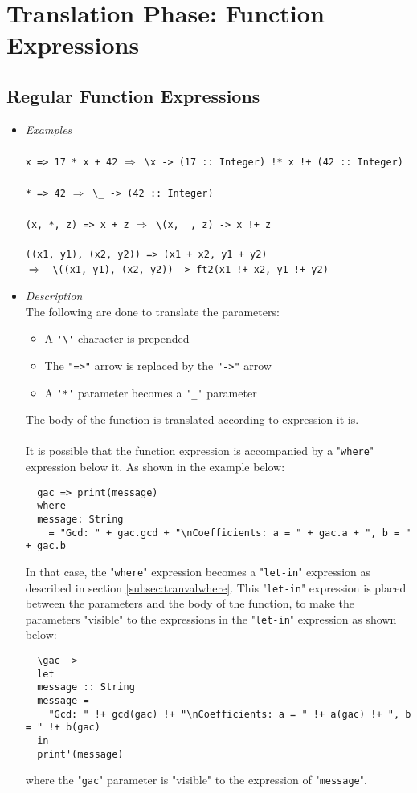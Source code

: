 \documentclass[diploma]{softlab-thesis}
\def\lra{$\Longrightarrow$\ }
\begin{document}
\newpage
\section{Translation Phase: Function Expressions}

\subsection{Regular Function Expressions}

\begin{itemize}
\item
\textit{Examples}\\\\
\verb|x => 17 * x + 42| \lra \verb|\x -> (17 :: Integer) !* x !+ (42 :: Integer)|
\\\\
\verb|* => 42| \lra \verb|\_ -> (42 :: Integer)|
\\\\
\verb|(x, *, z) => x + z| \lra \verb|\(x, _, z) -> x !+ z|
\\\\
\verb|((x1, y1), (x2, y2)) => (x1 + x2, y1 + y2)|\\
\lra
\verb|\((x1, y1), (x2, y2)) -> ft2(x1 !+ x2, y1 !+ y2)|\\

\item
\textit{Description}\\

The following are done to translate the parameters:
\begin{itemize}
\item
A \verb|'\'| character is prepended
\item
The \verb|"=>"| arrow is replaced by the \verb|"->"| arrow
\item
A \verb|'*'| parameter becomes a \verb|'_'| parameter
\end{itemize}
The body of the function is translated according to expression it
is.
\\\\
It is possible that the function expression is accompanied by a
"\texttt{where}" expression below it. As shown in the example below:
\begin{verbatim}
  gac => print(message)
  where
  message: String
    = "Gcd: " + gac.gcd + "\nCoefficients: a = " + gac.a + ", b = " + gac.b
\end{verbatim}
In that case, the "\texttt{where}" expression becomes a "\texttt{let-in}"
expression as described in section \ref{subsec:tranvalwhere}. This
"\texttt{let-in}" expression is placed between the parameters and the
body of the function, to make the parameters "visible" to the expressions
in the "\texttt{let-in}" expression as shown below:
\begin{verbatim}
  \gac ->
  let
  message :: String
  message =
    "Gcd: " !+ gcd(gac) !+ "\nCoefficients: a = " !+ a(gac) !+ ", b = " !+ b(gac)
  in
  print'(message)
\end{verbatim}
where the "\verb|gac|" parameter is "visible" to the expression of
"\verb|message|".

\end{itemize}
\end{document}
